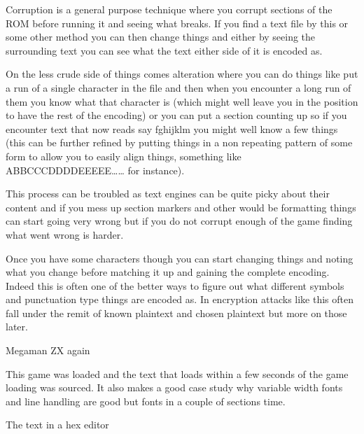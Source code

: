 \documentclass[
]{book}
\begin{document}
Corruption is a general purpose technique where you corrupt sections of the ROM before running it and seeing what breaks. If you find a text file by this or some other method you can then change things and either by seeing the surrounding text you can see what the text either side of it is encoded as.

On the less crude side of things comes alteration where you can do things like put a run of a single character in the file and then when you encounter a long run of them you know what that character is (which might well leave you in the position to have the rest of the encoding) or you can put a section counting up so if you encounter text that now reads say fghijklm you might well know a few things (this can be further refined by putting things in a non repeating pattern of some form to allow you to easily align things, something like ABBCCCDDDDEEEEE\ldots\ldots{} for instance).

This process can be troubled as text engines can be quite picky about their content and if you mess up section markers and other would be formatting things can start going very wrong but if you do not corrupt enough of the game finding what went wrong is harder.

Once you have some characters though you can start changing things and noting what you change before matching it up and gaining the complete encoding. Indeed this is often one of the better ways to figure out what different symbols and punctuation type things are encoded as. In encryption attacks like this often fall under the remit of known plaintext and chosen plaintext but more on those later.

Megaman ZX again

This game was loaded and the text that loads within a few seconds of the game loading was sourced. It also makes a good case study why variable width fonts and line handling are good but fonts in a couple of sections time.

The text in a hex editor
\end{document}
